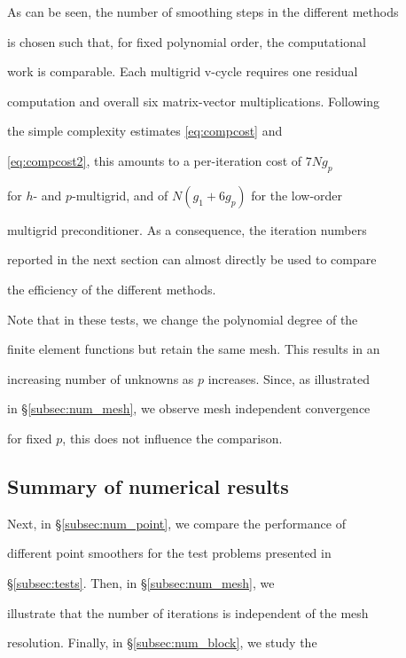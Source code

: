 \documentclass[smallcondensed,final]{svjour3}     %
\begin{document}



As can be seen, the number of smoothing steps in the different methods

is chosen such that, for fixed polynomial order, the computational

work is comparable. Each multigrid v-cycle requires one residual

computation and overall six matrix-vector multiplications.  Following

the simple complexity estimates \eqref{eq:compcost} and

\eqref{eq:compcost2}, this amounts to a per-iteration cost of $7Ng_p$

for $h$- and $p$-multigrid, and of $N(g_1+6g_p)$ for the low-order

multigrid preconditioner. As a consequence, the iteration numbers

reported in the next section can almost directly be used to compare

the efficiency of the different methods.

%

Note that in these tests, we change the polynomial degree of the

finite element functions but retain the same mesh. This results in an

increasing number of unknowns as $p$ increases. Since, as illustrated

in \S\ref{subsec:num_mesh}, we observe mesh independent convergence

for fixed $p$, this does not influence the comparison.





\subsection{Summary of numerical results}\label{subsec:results}

Next, in \S\ref{subsec:num_point}, we compare the performance of

different point smoothers for the test problems presented in

\S\ref{subsec:tests}. Then, in \S\ref{subsec:num_mesh}, we

illustrate that the number of iterations is independent of the mesh

resolution. Finally, in \S\ref{subsec:num_block}, we study the
\end{document}
